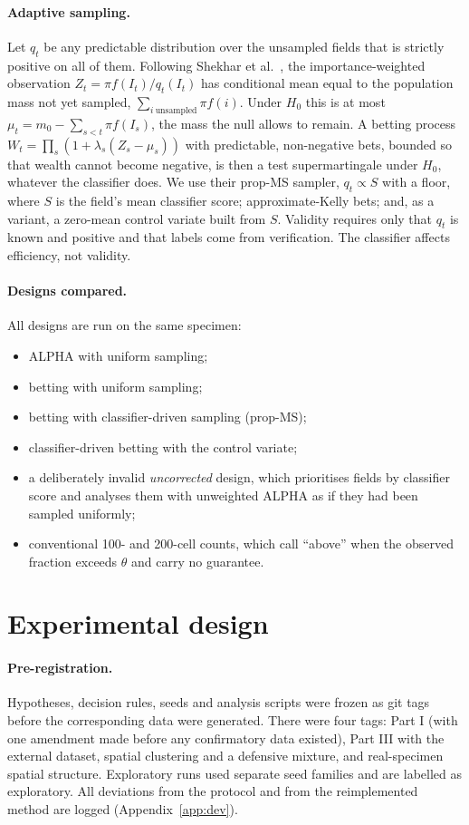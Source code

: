 \documentclass[11pt]{article}
\theoremstyle{remark}
\theoremstyle{definition}
\begin{document}
\paragraph{Adaptive sampling.} Let $q_t$ be any predictable distribution over the unsampled fields that is strictly positive on all of them. Following Shekhar et al.\ \cite{shekhar2023rlfa}, the importance-weighted observation $Z_t=\pi f(I_t)/q_t(I_t)$ has conditional mean equal to the population mass not yet sampled, $\sum_{i\ \text{unsampled}}\pi f(i)$. Under $H_0$ this is at most $\mu_t=m_0-\sum_{s<t}\pi f(I_s)$, the mass the null allows to remain. A betting process $W_t=\prod_s(1+\lambda_s(Z_s-\mu_s))$ with predictable, non-negative bets, bounded so that wealth cannot become negative, is then a test supermartingale under $H_0$, whatever the classifier does. We use their prop-MS sampler, $q_t\propto S$ with a floor, where $S$ is the field's mean classifier score; approximate-Kelly bets; and, as a variant, a zero-mean control variate built from $S$. Validity requires only that $q_t$ is known and positive and that labels come from verification. The classifier affects efficiency, not validity.

\paragraph{Designs compared.} All designs are run on the same specimen:
\begin{itemize}
\item ALPHA with uniform sampling;
\item betting with uniform sampling;
\item betting with classifier-driven sampling (prop-MS);
\item classifier-driven betting with the control variate;
\item a deliberately invalid \emph{uncorrected} design, which prioritises fields by classifier score and analyses them with unweighted ALPHA as if they had been sampled uniformly;
\item conventional 100- and 200-cell counts, which call ``above'' when the observed fraction exceeds $\theta$ and carry no guarantee.
\end{itemize}

\section{Experimental design}\label{sec:design}
\paragraph{Pre-registration.} Hypotheses, decision rules, seeds and analysis scripts were frozen as git tags before the corresponding data were generated. There were four tags: Part I (with one amendment made before any confirmatory data existed), Part III with the external dataset, spatial clustering and a defensive mixture, and real-specimen spatial structure. Exploratory runs used separate seed families and are labelled as exploratory. All deviations from the protocol and from the reimplemented method are logged (Appendix~\ref{app:dev}).
\end{document}
